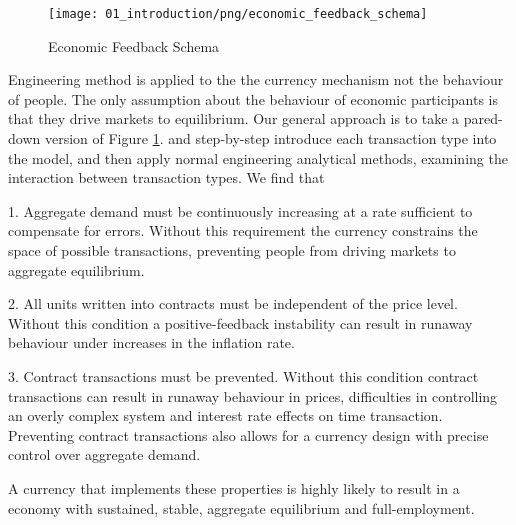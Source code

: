 \begin{figure}[H]
\centering
\texttt{[image: 01\_introduction/png/economic\_feedback\_schema]}
\caption{Economic Feedback Schema}
\label{fig:economic_feedback_schema1}
\end{figure}

Engineering method is applied to the the currency mechanism not the behaviour of people. The only
assumption about the behaviour of economic participants is that they drive markets to equilibrium.
Our general approach is to take a pared-down version of Figure \ref{fig:economic_feedback_schema1}.
and step-by-step introduce each transaction type into the model, and then apply normal engineering
analytical methods, examining the interaction between transaction types. We find that

1. Aggregate demand must be continuously increasing at a rate sufficient to compensate for errors.
Without this requirement the currency constrains the space of possible transactions, preventing
people from driving markets to aggregate equilibrium.

2. All units written into contracts must be independent of the price level. Without this condition a
positive-feedback instability can result in runaway behaviour under increases in the inflation rate.

3. Contract transactions must be prevented. Without this condition contract transactions can result
in runaway behaviour in prices, difficulties in controlling an overly complex system and interest
rate effects on time transaction. Preventing contract transactions also allows for a currency design
with precise control over aggregate demand.

A currency that implements these properties is highly likely to result in a economy with sustained,
stable, aggregate equilibrium and full-employment. 
